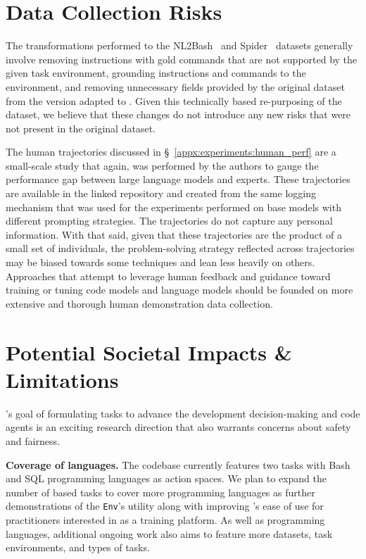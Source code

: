 \section{Data Collection Risks}
\label{appx:misc:data_collection_cklist}

The transformations performed to the NL2Bash~\cite{lin-etal-2018-nl2bash} and Spider~\cite{yu-etal-2018-spider} datasets generally involve removing instructions with gold commands that are not supported by the given task environment, grounding instructions and commands to the environment, and removing unnecessary fields provided by the original dataset from the version adapted to \benchmark{}. Given this technically based re-purposing of the dataset, we believe that these changes do not introduce any new risks that were not present in the original dataset.

The human trajectories discussed in \S~\ref{appx:experiments:human_perf} are a small-scale study that again, was performed by the authors to gauge the performance gap between large language models and experts. These trajectories are available in the linked repository and created from the same logging mechanism that was used for the experiments performed on base models with different prompting strategies. The trajectories do not capture any personal information. With that said, given that these trajectories are the product of a small set of individuals, the problem-solving strategy reflected across trajectories may be biased towards some techniques and lean less heavily on others. Approaches that attempt to leverage human feedback and guidance toward training or tuning code models and language models should be founded on more extensive and thorough human demonstration data collection.

\section{Potential Societal Impacts \& Limitations}
\label{appx:misc:potential_impacts}

\benchmark{}'s goal of formulating tasks to advance the development decision-making and code agents is an exciting research direction that also warrants concerns about safety and fairness.

\textbf{Coverage of languages.} The \benchmark{} codebase currently features two tasks with Bash and SQL programming languages as action spaces. We plan to expand the number of \benchmark{} based tasks to cover more programming languages as further demonstrations of the \texttt{\benchmark{}Env}'s utility along with improving \benchmark{}'s ease of use for practitioners interested in \benchmark{} as a training platform. As well as programming languages, additional ongoing work also aims to feature more datasets, task environments, and types of tasks.


